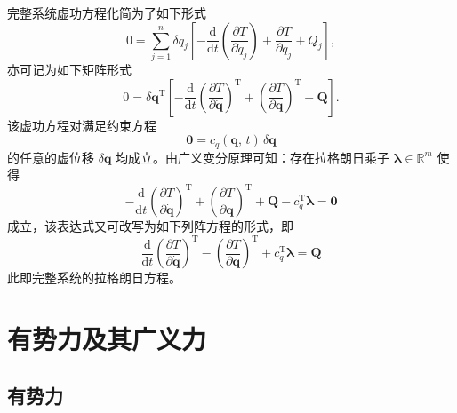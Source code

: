 完整系统虚功方程化简为了如下形式
\begin{equation}\label{eq:2.19}
0 = \sum_{j=1}^{n} \delta q_j \!\left[ -\frac{\mathrm{d}}{\mathrm{d}t}\!\left(\frac{\partial T}{\partial \dot{q}_j}\right) + \frac{\partial T}{\partial q_j} + Q_j \right],
\end{equation}
亦可记为如下矩阵形式
\begin{equation}\label{eq:2.20}
0 = \delta\boldsymbol{q}^{\mathrm{T}} \!\left[ -\frac{\mathrm{d}}{\mathrm{d}t}\!\left(\frac{\partial T}{\partial \dot{\boldsymbol{q}}}\right)^{\!\mathrm{T}} + \left(\frac{\partial T}{\partial \boldsymbol{q}}\right)^{\!\mathrm{T}} + \boldsymbol{Q} \right].
\end{equation}
该虚功方程对满足约束方程
\begin{equation*}
\boldsymbol{0} = c_q(\boldsymbol{q},\, t)\,\delta\boldsymbol{q}
\end{equation*}
的任意的虚位移 $\delta\boldsymbol{q}$ 均成立。由广义变分原理可知：存在拉格朗日乘子 $\boldsymbol{\lambda} \in \mathbb{R}^m$ 使得
\begin{equation*}
-\frac{\mathrm{d}}{\mathrm{d}t}\!\left(\frac{\partial T}{\partial \dot{\boldsymbol{q}}}\right)^{\!\mathrm{T}} + \left(\frac{\partial T}{\partial \boldsymbol{q}}\right)^{\!\mathrm{T}} + \boldsymbol{Q} - c_q^{\mathrm{T}} \boldsymbol{\lambda} = \boldsymbol{0}
\end{equation*}
成立，该表达式又可改写为如下列阵方程的形式，即
\begin{equation}\label{eq:2.21}
\boxed{\frac{\mathrm{d}}{\mathrm{d}t}\!\left(\frac{\partial T}{\partial \dot{\boldsymbol{q}}}\right)^{\!\mathrm{T}} - \left(\frac{\partial T}{\partial \boldsymbol{q}}\right)^{\!\mathrm{T}} + c_q^{\mathrm{T}} \boldsymbol{\lambda} = \boldsymbol{Q}}
\end{equation}
此即完整系统的拉格朗日方程。

\section{有势力及其广义力}

\subsection{有势力}

